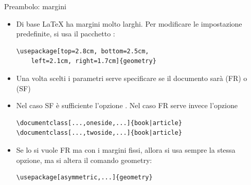 \documentclass{beamer}
\begin{document}
\begin{frame}[fragile]{Preambolo: margini}

\begin{itemize}
\item Di base \LaTeX{} ha margini molto larghi. Per modificare le impostazione predefinite, si usa il pacchetto :

\begin{verbatim}
\usepackage[top=2.8cm, bottom=2.5cm,
	left=2.1cm, right=1.7cm]{geometry}
\end{verbatim}
\item Una volta scelti i parametri serve specificare se il documento sar\`a  (FR) o  (SF)
\item Nel caso SF \`e sufficiente l'opzione . Nel caso FR serve invece l'opzione 
\begin{verbatim}
\documentclass[...,oneside,...]{book|article}
\documentclass[...,twoside,...]{book|article}
\end{verbatim}
\item Se lo si vuole FR ma con i margini fissi, allora si usa sempre la stessa opzione, ma si altera il comando geometry:
\begin{verbatim}
\usepackage[asymmetric,...]{geometry}
\end{verbatim}
\end{itemize}




\end{frame}
\end{document}
